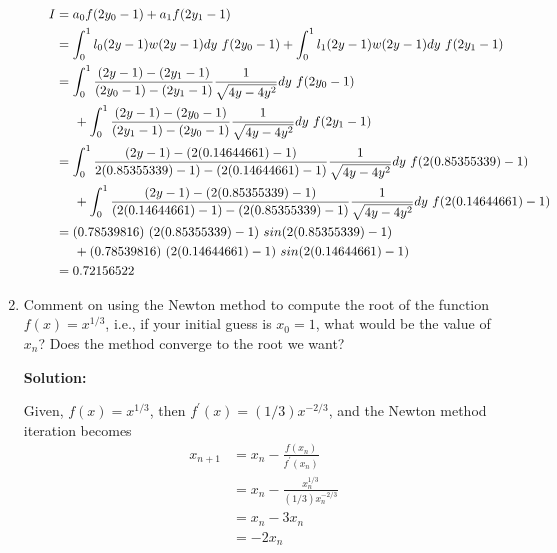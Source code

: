 \documentclass[a4paper,11pt]{report}
\begin{document}
\begin{enumerate}
\begin{itemize}
    \begin{equation*}
    \begin{aligned}
    I &= a_{0} f(2y_{0} - 1) + a_{1} f(2y_{1} - 1) \\
    &= \int_{0}^{1} l_{0}(2y-1) w(2y-1) dy\ f(2y_{0} - 1) + \int_{0}^{1} l_{1}(2y-1) w(2y-1) dy\ f(2y_{1} - 1) \\
    &= \int_{0}^{1} \frac{(2y-1)-(2y_{1}-1)}{(2y_{0}-1)-(2y_{1}-1)} \frac{1}{\sqrt{4y-4y^2}} dy\ f(2y_{0} - 1) \\ 
    & \hspace{0.5cm} + \int_{0}^{1} \frac{(2y-1)-(2y_{0}-1)}{(2y_{1}-1)-(2y_{0}-1)} \frac{1}{\sqrt{4y-4y^2}} dy\ f(2y_{1} - 1) \\
    &= \int_{0}^{1} \frac{(2y-1)-(2(0.14644661)-1)}{2(0.85355339)-1)-(2(0.14644661)-1)} \frac{1}{\sqrt{4y-4y^2}} dy\ f(2(0.85355339)-1) \\
    & \hspace{0.5cm} + \int_{0}^{1} \frac{(2y-1)-(2(0.85355339)-1)}{(2(0.14644661)-1)-(2(0.85355339)-1)} \frac{1}{\sqrt{4y-4y^2}} dy\ f(2(0.14644661)-1) \\
    &= (0.78539816)\ (2(0.85355339)-1)\ sin(2(0.85355339)-1) \\
    & \hspace{0.5cm} + (0.78539816)\ (2(0.14644661)-1)\ sin(2(0.14644661)-1) \\
    &= 0.72156522
    \end{aligned}
    \end{equation*}

    \end{itemize} 

    \vspace{1cm}

    \item Comment on using the Newton method to compute the root of the function $f(x)
    = x^{1/3}$, i.e., if your initial guess is $x_{0} = 1$, what would be the value of
    $x_{n}$? Does the method converge to the root we want?

    \textbf{Solution:}

    Given, $f(x) = x^{1/3}$, then $f^{\prime}(x) = (1/3)x^{-2/3}$, and the 
    Newton method iteration becomes
    \begin{equation*}
    \begin{aligned}
    x_{n+1} &= x_{n} - \frac{f(x_{n})}{f^{\prime}(x_{n})} \\
    &= x_{n} - \frac{x_{n}^{1/3}}{(1/3)x_{n}^{-2/3}} \\
    &= x_{n} - 3x_{n} \\
    &= -2x_{n}
    \end{aligned}
    \end{equation*}
    

\end{enumerate}
\end{document}
